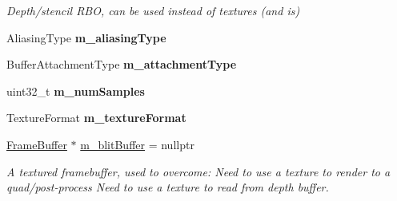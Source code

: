 \begin{Indent}
\begin{DoxyCompactItemize}
\begin{DoxyCompactList}\small\item\em Depth/stencil R\+BO, can be used instead of textures (and is) \end{DoxyCompactList}\item 
\mbox{\label{classrev_1_1_frame_buffer_ad2c765e67ee344c66966aafa6bf7caa9}} 
Aliasing\+Type {\bfseries m\+\_\+aliasing\+Type}
\item 
\mbox{\label{classrev_1_1_frame_buffer_acaf369b0ea5b4d5d42ea05c4d8e37856}} 
Buffer\+Attachment\+Type {\bfseries m\+\_\+attachment\+Type}
\item 
\mbox{\label{classrev_1_1_frame_buffer_a2fe5a026071db0dc259feeee4517ad43}} 
uint32\+\_\+t {\bfseries m\+\_\+num\+Samples}
\item 
\mbox{\label{classrev_1_1_frame_buffer_ae89cc9bf39bf08af5ff96e4cb2cbb116}} 
Texture\+Format {\bfseries m\+\_\+texture\+Format}
\item 
\mbox{\label{classrev_1_1_frame_buffer_aa06074126d11c105fdf47d1a5645db7c}} 
\mbox{\hyperlink{classrev_1_1_frame_buffer}{Frame\+Buffer}} $\ast$ \mbox{\hyperlink{classrev_1_1_frame_buffer_aa06074126d11c105fdf47d1a5645db7c}{m\+\_\+blit\+Buffer}} = nullptr
\begin{DoxyCompactList}\small\item\em A textured framebuffer, used to overcome\+: Need to use a texture to render to a quad/post-\/process Need to use a texture to read from depth buffer. \end{DoxyCompactList}\end{DoxyCompactItemize}
\end{Indent}

